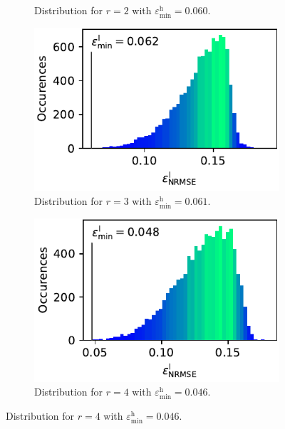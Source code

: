 \documentclass[
  a4paper,  %
  twoside,  %
  bibliography=totoc,
  headsepline,
  cleardoublepage=empty,
  parskip=half,
  draft=false
]{scrbook}
\begin{document}
\begin{mdframed}[style=style]
\begin{figure}[H]
\begin{subfigure}{.5\textwidth}
  \caption{Distribution for $r=2$ with $\varepsilon^\mathrm{h}_{\mathrm{min}}=0.060$.}
\vspace{3mm}
\label{fig:ishigami_hist_2}
\end{subfigure}%
\vspace{3mm}
  \begin{subfigure}{.5\textwidth}
  \centering
   \includegraphics[width=0.95\linewidth]{graphics/ww_hist_3}
  \caption{Distribution for $r=3$ with $\varepsilon^\mathrm{h}_{\mathrm{min}}=0.061$.}
\vspace{3mm}
\label{fig:ishigami_hist_2}
\end{subfigure}%
\begin{subfigure}{.5\textwidth}
  \centering
   \includegraphics[width=0.95\linewidth]{graphics/ww_hist_4}
  \caption{Distribution for $r=4$ with $\varepsilon^\mathrm{h}_{\mathrm{min}}=0.046$.}
\vspace{3mm}
\label{fig:ishigami_hist_3}
\end{subfigure}%

\end{figure}
\end{mdframed}
\end{document}
